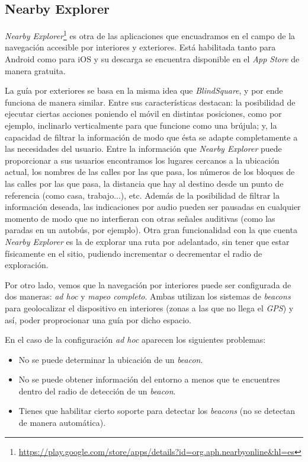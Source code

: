 
\subsection{Nearby Explorer}
\textit{Nearby Explorer}\footnote{\url{https://play.google.com/store/apps/details?id=org.aph.nearbyonline&hl=es}} es otra de las aplicaciones que encuadramos en el campo de la navegación accesible por interiores y exteriores. Está habilitada tanto para Android como para iOS y su descarga se encuentra disponible en el \textit{App Store} de manera gratuita. 

La guía por exteriores se basa en la misma idea que \textit{BlindSquare}, y por ende funciona de manera similar. Entre sus características destacan: la posibilidad de ejecutar ciertas acciones poniendo el móvil en distintas posiciones, como por ejemplo, inclinarlo verticalmente para que funcione como una brújula; y, la capacidad de filtrar la información de modo que ésta se adapte completamente a las necesidades del usuario. Entre la información que \textit{Nearby Explorer} puede proporcionar a sus usuarios encontramos los lugares cercanos a la ubicación actual, los nombres de las calles por las que pasa, los números de los bloques de las calles por las que pasa, la distancia que hay al destino desde un punto de referencia (como casa, trabajo...), etc. Además de la posibilidad de filtrar la información deseada, las indicaciones por audio pueden ser pausadas en cualquier momento de modo que no interfieran con otras señales auditivas (como las paradas en un autobús, por ejemplo). Otra gran funcionalidad con la que cuenta \textit{Nearby Explorer} es la de explorar una ruta por adelantado, sin tener que estar físicamente en el sitio, pudiendo incrementar o decrementar el radio de exploración.

Por otro lado, vemos que la navegación por interiores puede ser configurada de dos maneras: \textit{ad hoc} y \textit{mapeo completo}. Ambas utilizan los sistemas de \textit{beacons} para geolocalizar el dispositivo en interiores (zonas a las que no llega el \textit{GPS}) y así, poder proprocionar una guía por dicho espacio.

En el caso de la configuración \textit{ad hoc} aparecen los siguientes problemas:
\begin{itemize}
	\item No se puede determinar la ubicación de un \textit{beacon}.
	\item No se puede obtener información del entorno a menos que te encuentres dentro del radio de detección de un \textit{beacon}.
	\item Tienes que habilitar cierto soporte para detectar los \textit{beacons} (no se detectan de manera automática).
\end{itemize}


